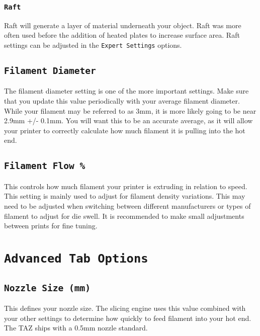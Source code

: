 \subsubsection{\texttt{Raft}}
Raft will generate a layer of material underneath your object. Raft was more often used before the addition of heated plates to increase surface area. Raft settings can be adjusted in the \texttt{Expert Settings} options.

\subsection{\texttt{Filament Diameter}}
The filament diameter setting is one of the more important settings. Make sure that you update this value periodically with your average filament diameter. While your filament may be referred to as 3mm, it is more likely going to be near 2.9mm +/- 0.1mm. You will want this to be an accurate average, as it will allow your printer to correctly calculate how much filament it is pulling into the hot end.

\subsection{\texttt{Filament Flow \%}}
This controls how much filament your printer is extruding in relation to speed. This setting is mainly used to adjust for filament density variations. This may need to be adjusted when switching between different manufacturers or types of filament to adjust for die swell. It is recommended to make small adjustments between prints for fine tuning.

\section{\texttt{Advanced Tab Options}}

\subsection{\texttt{Nozzle Size (mm)}}
This defines your nozzle size. The slicing engine uses this value combined with your other settings to determine how quickly to feed filament into your hot end. The TAZ ships with a 0.5mm nozzle standard. 



